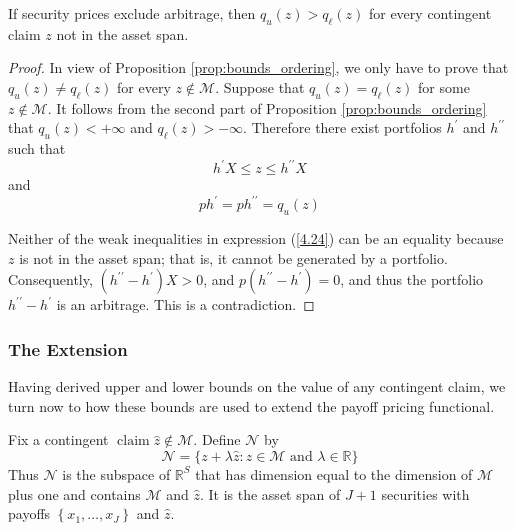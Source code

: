 \documentclass[\topdir/lecture\_notes.tex]{subfiles}
\begin{document}
\begin{optional}
\begin{proposition} \label{prop:bounds_strict_inequality}
If security prices exclude arbitrage, then \(q_{u}(z)>q_{\ell}(z)\) for every contingent claim \(z\) not in the asset span.
\end{proposition}
\begin{proof}
In view of Proposition \ref{prop:bounds_ordering}, we only have to prove that \(q_{u}(z) \neq q_{\ell}(z)\) for every \(z \notin \mathcal{M}\). Suppose that \(q_{u}(z)=q_{\ell}(z)\) for some \(z \notin \mathcal{M}\). It follows from the second part of Proposition \ref{prop:bounds_ordering} that \(q_{u}(z)<+\infty\) and \(q_{\ell}(z)>-\infty\). Therefore there exist portfolios \(h^{\prime}\) and \(h^{\prime \prime}\) such that
\begin{equation}
h^{\prime} X \leq z \leq h^{\prime \prime} X \label{4.24}
\end{equation}
and
\begin{equation*}
p h^{\prime}=p h^{\prime \prime}=q_{u}(z) 
\end{equation*}

Neither of the weak inequalities in expression (\ref{4.24}) can be an equality because \(z\) is not in the asset span; that is, it cannot be generated by a portfolio. Consequently, \(\left(h^{\prime \prime}-h^{\prime}\right) X>0\), and \(p\left(h^{\prime \prime}-h^{\prime}\right)=0\), and thus the portfolio \(h^{\prime \prime}-h^{\prime}\) is an arbitrage. This is a contradiction.
\end{proof}

\subsubsection*{The Extension}
Having derived upper and lower bounds on the value of any contingent claim, we turn now to how these bounds are used to extend the payoff pricing functional.

Fix a contingent \(\operatorname{claim} \hat{z} \notin \mathcal{M}\). Define \(\mathcal{N}\) by
\begin{equation*}
\mathcal{N}=\{z+\lambda \hat{z}: z \in \mathcal{M} \text { and } \lambda \in \mathbb{R}\} 
\end{equation*}
Thus \(\mathcal{N}\) is the subspace of \(\mathbb{R}^{S}\) that has dimension equal to the dimension of \(\mathcal{M}\) plus one and contains \(\mathcal{M}\) and \(\hat{z}\). It is the asset span of \(J+1\) securities with payoffs \(\left\{x_{1}, \ldots, x_{J}\right\}\) and \(\hat{z}\).


\end{optional}
\end{document}
